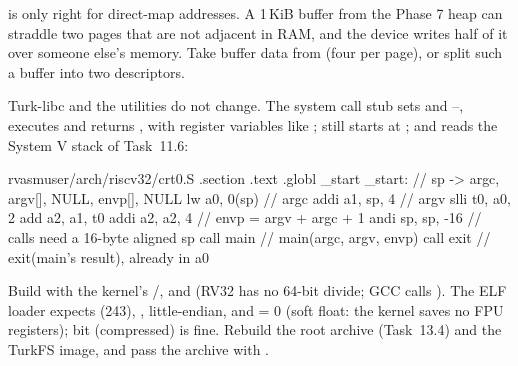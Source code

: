 \documentclass[11pt,a4paper]{article}
\begin{document}
\begin{warnbox}
 is only right for direct-map addresses. A 1\,KiB buffer from the Phase 7 heap can straddle two pages
that are not adjacent in RAM, and the device writes half of it over someone else's memory. Take buffer data from
 (four per page), or split such a buffer into two descriptors.
\end{warnbox}

Turk-libc and the utilities do not change. The system call stub sets  and --, executes
 and returns , with register variables like ;  still starts at
; and  reads the System V stack of Task~11.6:

\begin{lst}{rvasm}{user/arch/riscv32/crt0.S}
    .section .text
    .globl _start
_start:                             // sp -> argc, argv[], NULL, envp[], NULL
    lw    a0, 0(sp)                 // argc
    addi  a1, sp, 4                 // argv
    slli  t0, a0, 2
    add   a2, a1, t0
    addi  a2, a2, 4                 // envp = argv + argc + 1
    andi  sp, sp, -16               // calls need a 16-byte aligned sp
    call  main                      // main(argc, argv, envp)
    call  exit                      // exit(main's result), already in a0
\end{lst}

Build with the kernel's /,  and  (RV32 has no 64-bit
divide; GCC calls ). The ELF loader expects  (243), , little-endian,
and  = 0 (soft float: the kernel saves no FPU registers); bit  (compressed) is fine.
Rebuild the root archive (Task~13.4) and the TurkFS image, and pass the archive with .
\end{document}
